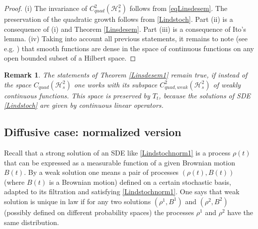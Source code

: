 \documentclass[10pt,a4paper]{amsart}
\def\HC{\mathcal{H}}
\def\ga{\gamma}
\newtheorem{remark}{Remark}
\begin{document}
\begin{proof}
(i) The invariance of $C_{quad}^2(\HC^2_s)$ follows from
\eqref{eqLinsdesem}. The preservation of the quadratic growth
 follows from \eqref{Lindstoch}. Part (ii) is a consequence of (i) and Theorem \ref{Linsdesem}.
 Part (iii) is a consequence of Ito's lemma. (iv) Taking into account all previous statements,
it remains to note (see e.g. \cite{Eells}) that smooth functions are dense in the space of continuous functions
on any open bounded subset of a Hilbert space.
\end{proof}

\begin{remark}
The statements of Theorem \ref{Linsdesem1} remain true, if instead of
the space $C_{quad}(\HC^2_s)$ one works with its subspace $C_{quad, weak}^2(\HC^2_s)$ of weakly continuous functions.
This space is preserved by $T_t$, because the solutions of  SDE \eqref{Lindstoch} are given by continuous linear operators.
\end{remark}


\subsection{Diffusive case: normalized version}
\label{secnormeq}

 Recall that a strong
solution of an SDE like \eqref{Lindstochnorm1} is a process $\rho(t)$ that can
 be expressed as a measurable function of a given Brownian motion $B(t)$. By a
weak solution one means a pair of processes $(\rho(t),B(t))$ (where $B(t)$ is a Brownian
motion) defined on a certain stochastic basis, adapted to its filtration and satisfying
\eqref{Lindstochnorm1}. One says that weak solution is  unique in law
if for any two solutions $(\rho^1,B^1)$ and $(\rho^2,B^2)$ (possibly defined on
different probability spaces) the processes $\rho^1$ and $\rho^2$ have the same distribution.
\end{document}
